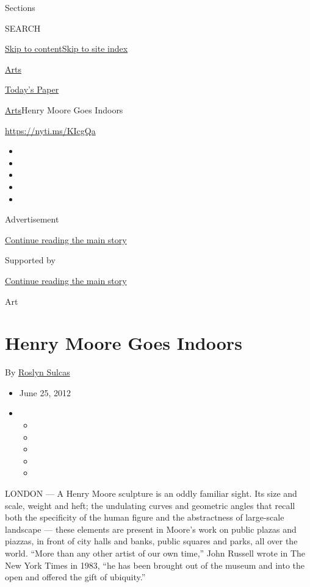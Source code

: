 Sections

SEARCH

\protect\hyperlink{site-content}{Skip to
content}\protect\hyperlink{site-index}{Skip to site index}

\href{https://www.nytimes3xbfgragh.onion/section/arts}{Arts}

\href{https://myaccount.nytimes3xbfgragh.onion/auth/login?response_type=cookie\&client_id=vi}{}

\href{https://www.nytimes3xbfgragh.onion/section/todayspaper}{Today's
Paper}

\href{/section/arts}{Arts}\textbar{}Henry Moore Goes Indoors

\url{https://nyti.ms/KIcgQa}

\begin{itemize}
\item
\item
\item
\item
\item
\end{itemize}

Advertisement

\protect\hyperlink{after-top}{Continue reading the main story}

Supported by

\protect\hyperlink{after-sponsor}{Continue reading the main story}

Art

\hypertarget{henry-moore-goes-indoors}{%
\section{Henry Moore Goes Indoors}\label{henry-moore-goes-indoors}}

By \href{https://www.nytimes3xbfgragh.onion/by/roslyn-sulcas}{Roslyn
Sulcas}

\begin{itemize}
\item
  June 25, 2012
\item
  \begin{itemize}
  \item
  \item
  \item
  \item
  \item
  \end{itemize}
\end{itemize}

LONDON --- A Henry Moore sculpture is an oddly familiar sight. Its size
and scale, weight and heft; the undulating curves and geometric angles
that recall both the specificity of the human figure and the
abstractness of large-scale landscape --- these elements are present in
Moore's work on public plazas and piazzas, in front of city halls and
banks, public squares and parks, all over the world. ``More than any
other artist of our own time,'' John Russell wrote in The New York Times
in 1983, ``he has been brought out of the museum and into the open and
offered the gift of ubiquity.''

